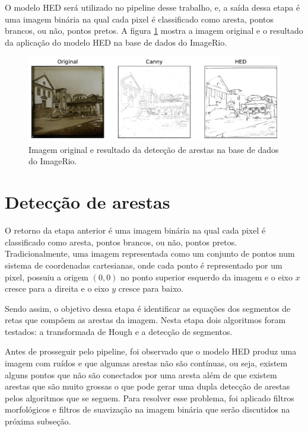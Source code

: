 \documentclass[12pt]{article}
\begin{document}
O modelo HED será utilizado no pipeline desse trabalho, e, a saída dessa etapa é uma imagem binária na qual cada pixel é classificado como aresta, pontos brancos, ou não, pontos pretos. A figura \ref{fig:bdarestas} mostra a imagem original e o resultado da aplicação do modelo HED na base de dados do ImageRio.

\begin{figure}
\centering
\includegraphics[scale=0.60]{exemple_edge.pdf}
\caption{Imagem original e resultado da detecção de arestas na base de dados do ImageRio.}
\label{fig:bdarestas}
\end{figure}

\section{Detecção de arestas}

O retorno da etapa anterior é uma imagem binária na qual cada pixel é classificado como aresta, pontos brancos, ou não, pontos pretos. Tradicionalmente, uma imagem representada como um conjunto de pontos num sistema de coordenadas cartesianas, onde cada ponto é representado por um pixel, possuiu a origem $(0,0)$ no ponto superior esquerdo da imagem e o eixo $x$ cresce para a direita e o eixo $y$ cresce para baixo. 

Sendo assim, o objetivo dessa etapa é identificar as equações dos segmentos de retas que compõem as arestas da imagem. Nesta etapa dois algoritmos foram testados: a transformada de Hough e a detecção de segmentos.

Antes de prosseguir pelo pipeline, foi observado que o modelo HED produz uma imagem com ruídos e que algumas arestas não são contínuas, ou seja, existem alguns pontos que não são conectados por uma aresta além de que existem arestas que são muito grossas o que pode gerar uma dupla detecção de arestas pelos algoritmos que se seguem. Para resolver esse problema, foi aplicado filtros morfológicos e filtros de suavização na imagem binária que serão discutidos na próxima subseção.
\end{document}
